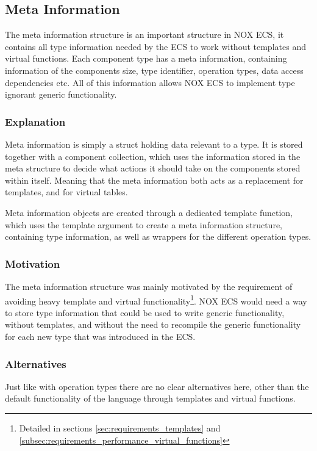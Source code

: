 \subsection{Meta Information}
\label{subsec:detailed_meta_information}
The meta information structure is an important structure in NOX ECS,
it contains all type information needed by the ECS to work without
templates and virtual functions.
Each component type has a meta information, containing information
of the components size, type identifier,
operation types, data access dependencies etc.
All of this information allows NOX ECS to implement type ignorant generic functionality.

\subsubsection{Explanation}
Meta information is simply a struct holding data relevant to a type.
It is stored together with a component collection,
which uses the information stored in the meta structure to decide what actions
it should take on the components stored within itself.
Meaning that the meta information both acts as a replacement for templates,
and for virtual tables.

Meta information objects are created through a dedicated template function,
which uses the template argument to create a meta information structure,
containing type information, as well as wrappers for the different operation types.

\subsubsection{Motivation}
The meta information structure was mainly motivated by the requirement of avoiding heavy template and virtual functionality\footnote{Detailed in sections \ref{sec:requirements_templates} and \ref{subsec:requirements_performance_virtual_functions}}.
NOX ECS would need a way to store type information that could be used to write generic functionality, without templates,
and without the need to recompile the generic functionality for each new type that was introduced in the ECS.

\subsubsection{Alternatives}
Just like with operation types there are no clear alternatives here, other than
the default functionality of the language through templates and virtual functions.

